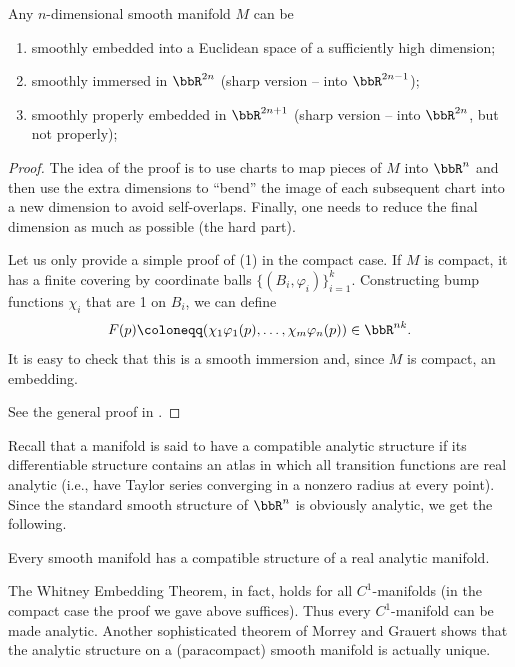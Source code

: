 \begin{thm}\label{thm whitney embedding}
    Any $n$-dimensional smooth manifold $M$ can be
    \begin{enumerate}[label=(\arabic*)]
        \item smoothly embedded into a Euclidean space of a sufficiently high dimension;
        \item smoothly immersed in $\bbR^{2n}$ (sharp version -- into $\bbR^{2n-1}$);
        \item smoothly properly embedded in $\bbR^{2n+1}$ (sharp version -- into $\bbR^{2n}$, but not properly);
    \end{enumerate}
    \end{thm}
\begin{proof}
    The idea of the proof is to use charts to map pieces of $M$ into $\bbR^n$ and then use the extra dimensions to ``bend'' the image of each subsequent chart into a new dimension to avoid self-overlaps. Finally, one needs to reduce the final dimension as much as possible (the hard part).

    Let us only provide a simple proof of (1) in the compact case. If $M$ is compact, it has a finite covering by coordinate balls $\{(B_i,\varphi_i)\}_{i=1}^k$. Constructing bump functions $\chi_i$ that are 1 on $B_i$, we can define
    \[
        F(p)\coloneqq (\chi_1\varphi_1(p),\ldots, \chi_m\varphi_n(p))\in\bbR^{nk}.
    \]
    It is easy to check that this is a smooth immersion and, since $M$ is compact, an embedding.

    See the general proof in \cite[Thm. 6.15]{Lee}.
\end{proof}

Recall that a manifold is said to have a compatible analytic structure if its differentiable structure contains an atlas in which all transition functions are real analytic (i.e., have Taylor series converging in a nonzero radius at every point). Since the standard smooth structure of $\bbR^n$ is obviously analytic, we get the following.

\begin{cor}
    Every smooth manifold has a compatible structure of a real analytic manifold.
\end{cor}
\begin{rem}
    The Whitney Embedding Theorem, in fact, holds for all $C^1$-manifolds (in the compact case the proof we gave above suffices). Thus every $C^1$-manifold can be made analytic. Another sophisticated theorem of Morrey and Grauert shows that the analytic structure on a (paracompact) smooth manifold is actually unique.
\end{rem}

